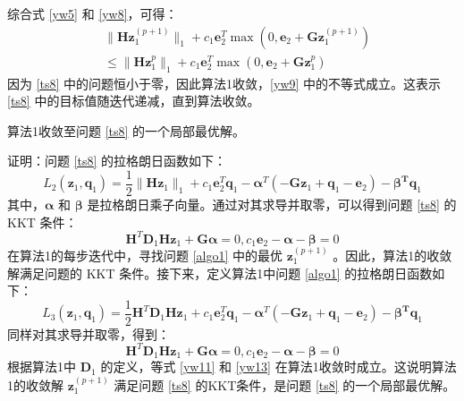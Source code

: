 综合式 \eqref{yw5} 和 \eqref{yw8}，可得：
\begin{equation}
\begin{aligned}
&\|\mathbf{Hz}^{(p+1)}_{1}\|_{1}+c_{1}\mathbf{e}^{T}_{2}\mathop{\max}(0,\mathbf{e}_{2}+\mathbf{Gz}^{(p+1)}_{1})\\
&\le\|\mathbf{Hz}^{p}_{1}\|_{1}+c_{1}\mathbf{e}^{T}_{2}\mathop{\max}(0,\mathbf{e}_{2}+\mathbf{Gz}^{p}_{1})
\end{aligned}
\label{yw9}
\end{equation}
因为 \eqref{ts8} 中的问题恒小于零，因此算法1收敛，\eqref{yw9} 中的不等式成立。这表示 \eqref{ts8} 中的目标值随迭代递减，直到算法收敛。

\begin{theorem}
算法1收敛至问题 \eqref{ts8} 的一个局部最优解。
\end{theorem}

证明：问题 \eqref{ts8} 的拉格朗日函数如下：
\begin{equation}
L_{2}(\mathbf{z}_{1},\mathbf{q}_{1})=\frac{1}{2}\|\mathbf{Hz}_{1}\|_{1}+
c_{1}\mathbf{e}^{T}_{2}\mathbf{q}_{1}-\mathbf{\alpha}^{T}(-\mathbf{Gz}_{1}+\mathbf{q}_{1}-\mathbf{e}_{2})
-\mathbf{\beta^{T}q}_{1}
\label{yw10}
\end{equation}
其中，$\mathbf{\alpha}$ 和 $\mathbf{\beta}$ 是拉格朗日乘子向量。通过对其求导并取零，可以得到问题 \eqref{ts8} 的 KKT 条件：
\begin{equation}
\mathbf{H}^{T}\mathbf{D}_{1}\mathbf{Hz}_{1}+\mathbf{G\alpha}=0,
c_{1}\mathbf{e}_{2}-\mathbf{\alpha}-\mathbf{\beta}=0
\label{yw11}
\end{equation}
在算法1的每步迭代中，寻找问题 \eqref{algo1} 中的最优 $\mathbf{z}^{(p+1)}_{1}$ 。因此，算法1的收敛解满足问题的 KKT 条件。接下来，定义算法1中问题 \eqref{algo1} 的拉格朗日函数如下：
\begin{equation}
L_{3}(\mathbf{z}_{1},\mathbf{q}_{1})=\frac{1}{2}\mathbf{H}^{T}\mathbf{D}_{1}\mathbf{Hz}_{1}+
c_{1}\mathbf{e}^{T}_{2}\mathbf{q}_{1}-\mathbf{\alpha}^{T}(-\mathbf{Gz}_{1}+\mathbf{q}_{1}-\mathbf{e}_{2})
-\mathbf{\beta^{T}q}_{1}
\label{yw12}
\end{equation}
同样对其求导并取零，得到：
\begin{equation}
\mathbf{H}^{T}\mathbf{D}_{1}\mathbf{Hz}_{1}+\mathbf{G\alpha}=0,
c_{1}\mathbf{e}_{2}-\mathbf{\alpha}-\mathbf{\beta}=0
\label{yw13}
\end{equation}
根据算法1中 $\mathbf{D}_{1}$ 的定义，等式 \eqref{yw11} 和 \eqref{yw13} 在算法1收敛时成立。这说明算法1的收敛解 $\mathbf{z}^{(p+1)}_{1}$ 满足问题 \eqref{ts8} 的KKT条件，是问题 \eqref{ts8} 的一个局部最优解。
